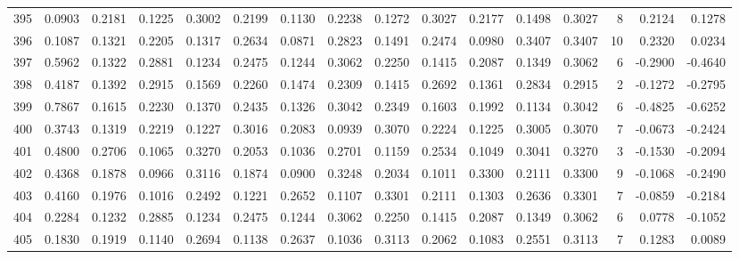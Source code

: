 \begin{tabular}{lrrrrrrrrrrrrrrr}
395 &      0.0903 &  0.2181 &  0.1225 &  0.3002 &  0.2199 &  0.1130 &  0.2238 &  0.1272 &  0.3027 &  0.2177 &   0.1498 &     0.3027 &      8 &                    0.2124 &                     0.1278 \\
396 &      0.1087 &  0.1321 &  0.2205 &  0.1317 &  0.2634 &  0.0871 &  0.2823 &  0.1491 &  0.2474 &  0.0980 &   0.3407 &     0.3407 &     10 &                    0.2320 &                     0.0234 \\
397 &      0.5962 &  0.1322 &  0.2881 &  0.1234 &  0.2475 &  0.1244 &  0.3062 &  0.2250 &  0.1415 &  0.2087 &   0.1349 &     0.3062 &      6 &                   -0.2900 &                    -0.4640 \\
398 &      0.4187 &  0.1392 &  0.2915 &  0.1569 &  0.2260 &  0.1474 &  0.2309 &  0.1415 &  0.2692 &  0.1361 &   0.2834 &     0.2915 &      2 &                   -0.1272 &                    -0.2795 \\
399 &      0.7867 &  0.1615 &  0.2230 &  0.1370 &  0.2435 &  0.1326 &  0.3042 &  0.2349 &  0.1603 &  0.1992 &   0.1134 &     0.3042 &      6 &                   -0.4825 &                    -0.6252 \\
400 &      0.3743 &  0.1319 &  0.2219 &  0.1227 &  0.3016 &  0.2083 &  0.0939 &  0.3070 &  0.2224 &  0.1225 &   0.3005 &     0.3070 &      7 &                   -0.0673 &                    -0.2424 \\
401 &      0.4800 &  0.2706 &  0.1065 &  0.3270 &  0.2053 &  0.1036 &  0.2701 &  0.1159 &  0.2534 &  0.1049 &   0.3041 &     0.3270 &      3 &                   -0.1530 &                    -0.2094 \\
402 &      0.4368 &  0.1878 &  0.0966 &  0.3116 &  0.1874 &  0.0900 &  0.3248 &  0.2034 &  0.1011 &  0.3300 &   0.2111 &     0.3300 &      9 &                   -0.1068 &                    -0.2490 \\
403 &      0.4160 &  0.1976 &  0.1016 &  0.2492 &  0.1221 &  0.2652 &  0.1107 &  0.3301 &  0.2111 &  0.1303 &   0.2636 &     0.3301 &      7 &                   -0.0859 &                    -0.2184 \\
404 &      0.2284 &  0.1232 &  0.2885 &  0.1234 &  0.2475 &  0.1244 &  0.3062 &  0.2250 &  0.1415 &  0.2087 &   0.1349 &     0.3062 &      6 &                    0.0778 &                    -0.1052 \\
405 &      0.1830 &  0.1919 &  0.1140 &  0.2694 &  0.1138 &  0.2637 &  0.1036 &  0.3113 &  0.2062 &  0.1083 &   0.2551 &     0.3113 &      7 &                    0.1283 &                     0.0089 \\

\end{tabular}
